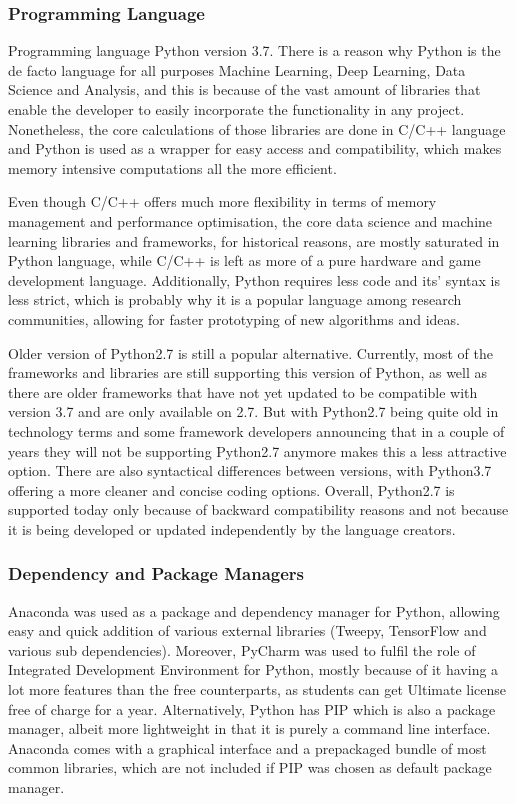         \subsubsection{Programming Language}
            Programming language Python version 3.7. There is a reason why Python is the de facto language for all purposes Machine Learning, Deep Learning, Data Science and Analysis, and this is because of the vast amount of libraries that enable the developer to easily incorporate the functionality in any project. Nonetheless, the core calculations of those libraries are done in C/C++ language and Python is used as a wrapper for easy access and compatibility, which makes memory intensive computations all the more efficient. 
            
            Even though C/C++ offers much more flexibility in terms of memory management and performance optimisation, the core data science and machine learning libraries and frameworks, for historical reasons, are mostly saturated in Python language, while C/C++ is left as more of a pure hardware and game development language. Additionally, Python requires less code and its' syntax is less strict, which is probably why it is a popular language among research communities, allowing for faster prototyping of new algorithms and ideas.
            
            Older version of Python2.7 is still a popular alternative. Currently, most of the frameworks and libraries are still supporting this version of Python, as well as there are older frameworks that have not yet updated to be compatible with version 3.7 and are only available on 2.7. But with Python2.7 being quite old in technology terms and some framework developers announcing that in a couple of years they will not be supporting Python2.7 anymore makes this a less attractive option. There are also syntactical differences between versions, with Python3.7 offering a more cleaner and concise coding options. Overall, Python2.7 is supported today only because of backward compatibility reasons and not because it is being developed or updated independently by the language creators.
        
        \subsubsection{Dependency and Package Managers}
            Anaconda was used as a package and dependency manager for Python, allowing easy and quick addition of various external libraries (Tweepy, TensorFlow and various sub dependencies). Moreover, PyCharm was used to fulfil the role of Integrated Development Environment for Python, mostly because of it having a lot more features than the free counterparts, as students can get Ultimate license free of charge for a year. Alternatively, Python has PIP which is also a package manager, albeit more lightweight in that it is purely a command line interface. Anaconda comes with a graphical interface and a prepackaged bundle of most common libraries, which are not included if PIP was chosen as default package manager.
            
